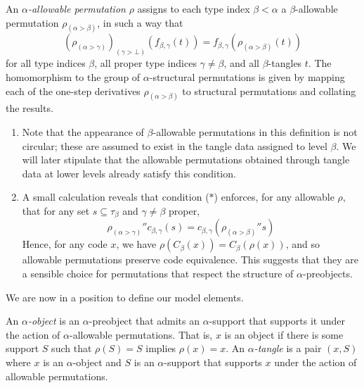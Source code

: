 \begin{definition}
    \label{def:allowable}
    An \emph{\( \alpha \)-allowable permutation} \( \rho \) assigns to each type index \( \beta < \alpha \) a \( \beta \)-allowable permutation \( \rho_{(\alpha > \beta)} \), in such a way that
    \begin{equation}
        (\rho_{(\alpha > \gamma)})_{(\gamma > \bot)}(f_{\beta,\gamma}(t)) = f_{\beta,\gamma}(\rho_{(\alpha > \beta)}(t))
        \tag{\( \ast \)}
    \end{equation}
    for all type indices \( \beta \), all proper type indices \( \gamma \neq \beta \), and all \( \beta \)-tangles \( t \).
    The homomorphism to the group of \( \alpha \)-structural permutations is given by mapping each of the one-step derivatives \( \rho_{(\alpha > \beta)} \) to structural permutations and collating the results.
\end{definition}
\begin{remark}
    \begin{enumerate}
        \item Note that the appearance of \( \beta \)-allowable permutations in this definition is not circular; these are assumed to exist in the tangle data assigned to level \( \beta \).
        We will later stipulate that the allowable permutations obtained through tangle data at lower levels already satisfy this condition.
        \item A small calculation reveals that condition (\( \ast \)) enforces, for any allowable \( \rho \), that for any set \( s \subseteq \tau_\beta \) and \( \gamma \neq \beta \) proper, \[ {\rho_{(\alpha > \gamma)}} '' c_{\beta,\gamma}(s) = c_{\beta,\gamma}({\rho_{(\alpha > \beta)}} '' s) \]
        Hence, for any code \( x \), we have \( \rho(C_\beta(x)) = C_\beta(\rho(x)) \), and so allowable permutations preserve code equivalence.
        This suggests that they are a sensible choice for permutations that respect the structure of \( \alpha \)-preobjects.
    \end{enumerate}
\end{remark}

We are now in a position to define our model elements.

\begin{definition}
    An \emph{\( \alpha \)-object} is an \( \alpha \)-preobject that admits an \( \alpha \)-support that supports it under the action of \( \alpha \)-allowable permutations.
    That is, \( x \) is an object if there is some support \( S \) such that \( \rho(S) = S \) implies \( \rho(x) = x \).
    An \emph{\( \alpha \)-tangle} is a pair \( (x, S) \) where \( x \) is an \( \alpha \)-object and \( S \) is an \( \alpha \)-support that supports \( x \) under the action of allowable permutations.
\end{definition}

